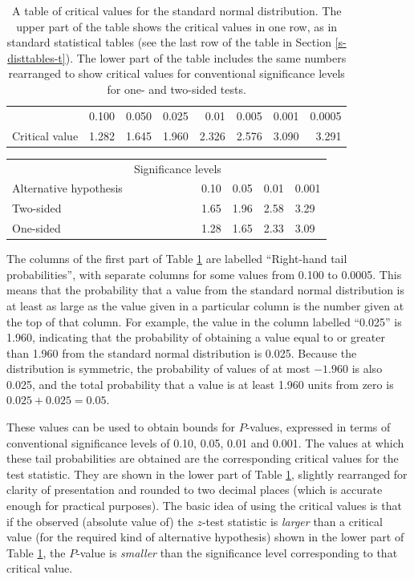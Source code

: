 \documentclass[11pt,a4paper,openany]{book}
\begin{document}
\begin{longtable}[]{@{}lrrrrrrr@{}}
\caption{\label{tab:t-ttable} A table of critical values for the standard
normal distribution. The upper part of the table shows the critical
values in one row, as in standard statistical tables (see the last row
of the table in Section \ref{s-disttables-t}). The lower part of the
table includes the same numbers rearranged to show critical values for
conventional significance levels for one- and two-sided
tests.}\tabularnewline
\toprule
& 0.100 & 0.050 & 0.025 & 0.01 & 0.005 & 0.001 & 0.0005\tabularnewline
Critical value & 1.282 & 1.645 & 1.960 & 2.326 & 2.576 & 3.090 &
3.291\tabularnewline
\bottomrule
\end{longtable}

\begin{longtable}[]{@{}lrlll@{}}
\toprule
& Significance levels & & &\tabularnewline
Alternative hypothesis & 0.10 & 0.05 & 0.01 & 0.001\tabularnewline
Two-sided & 1.65 & 1.96 & 2.58 & 3.29\tabularnewline
One-sided & 1.28 & 1.65 & 2.33 & 3.09\tabularnewline
\bottomrule
\end{longtable}

The columns of the first part of Table \ref{tab:t-ttable} are labelled
``Right-hand tail probabilities'', with separate columns for some values
from 0.100 to 0.0005. This means that the probability that a value from
the standard normal distribution is at least as large as the value given
in a particular column is the number given at the top of that column.
For example, the value in the column labelled ``0.025'' is 1.960,
indicating that the probability of obtaining a value equal to or greater
than 1.960 from the standard normal distribution is 0.025. Because the
distribution is symmetric, the probability of values of at most
\(-1.960\) is also 0.025, and the total probability that a value is at
least 1.960 units from zero is \(0.025+0.025=0.05\).

These values can be used to obtain bounds for \(P\)-values, expressed in
terms of conventional significance levels of 0.10, 0.05, 0.01 and 0.001.
The values at which these tail probabilities are obtained are the
corresponding critical values for the test statistic. They are shown in
the lower part of Table \ref{tab:t-ttable}, slightly rearranged for
clarity of presentation and rounded to two decimal places (which is
accurate enough for practical purposes). The basic idea of using the
critical values is that if the observed (absolute value of) the
\(z\)-test statistic is \emph{larger} than a critical value (for the
required kind of alternative hypothesis) shown in the lower part of
Table \ref{tab:t-ttable}, the \(P\)-value is \emph{smaller} than the
significance level corresponding to that critical value.
\end{document}
